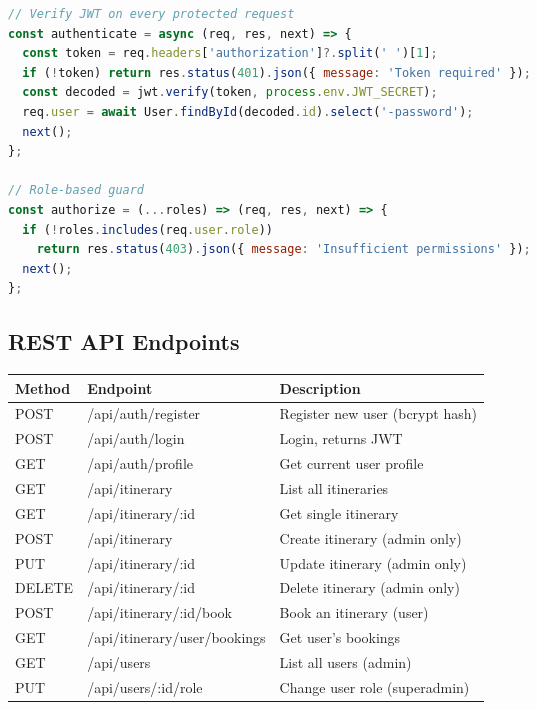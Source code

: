 \documentclass[12pt,a4paper]{article}
\begin{document}
\begin{lstlisting}[language=JavaScript]
// Verify JWT on every protected request
const authenticate = async (req, res, next) => {
  const token = req.headers['authorization']?.split(' ')[1];
  if (!token) return res.status(401).json({ message: 'Token required' });
  const decoded = jwt.verify(token, process.env.JWT_SECRET);
  req.user = await User.findById(decoded.id).select('-password');
  next();
};

// Role-based guard
const authorize = (...roles) => (req, res, next) => {
  if (!roles.includes(req.user.role))
    return res.status(403).json({ message: 'Insufficient permissions' });
  next();
};
\end{lstlisting}

\subsection{REST API Endpoints}

\begin{longtable}{>{\ttfamily}p{1.5cm} >{\ttfamily}p{5.5cm} p{6cm}}
\toprule
\normalfont\textbf{Method} & \normalfont\textbf{Endpoint} & \normalfont\textbf{Description} \\
\midrule
\endhead
POST & /api/auth/register & Register new user (bcrypt hash) \\
POST & /api/auth/login & Login, returns JWT \\
GET  & /api/auth/profile & Get current user profile \\
\midrule
GET  & /api/itinerary & List all itineraries \\
GET  & /api/itinerary/:id & Get single itinerary \\
POST & /api/itinerary & Create itinerary (admin only) \\
PUT  & /api/itinerary/:id & Update itinerary (admin only) \\
DELETE & /api/itinerary/:id & Delete itinerary (admin only) \\
POST & /api/itinerary/:id/book & Book an itinerary (user) \\
GET  & /api/itinerary/user/bookings & Get user's bookings \\
\midrule
GET  & /api/users & List all users (admin) \\
PUT  & /api/users/:id/role & Change user role (superadmin) \\
\bottomrule
\end{longtable}

\end{document}
